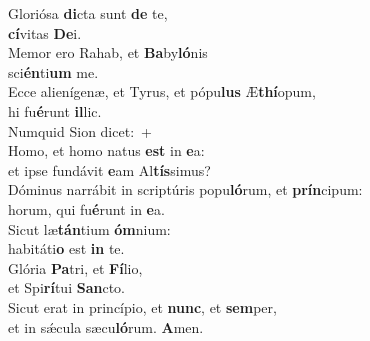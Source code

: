\evenverse Gloriósa \textbf{di}cta sunt \textbf{de} te,~\*\\
\evenverse \textbf{cí}vitas \textbf{De}i.\\
\oddverse Memor ero Rahab, et \textbf{Ba}by\textbf{ló}nis~\*\\
\oddverse sci\textbf{én}ti\textbf{um} me.\\
\evenverse Ecce alienígenæ, et Tyrus, et pópu\textbf{lus} Æ\textbf{thí}opum,~\*\\
\evenverse hi fu\textbf{é}runt \textbf{il}lic.\\
\oddverse Numquid Sion dicet:~+\\
\oddverse  Homo, et homo natus \textbf{est} in \textbf{e}a:~\*\\
\oddverse et ipse fundávit \textbf{e}am Al\textbf{tís}simus?\\
\evenverse Dóminus narrábit in scriptúris popu\textbf{ló}rum, et \textbf{prín}cipum:~\*\\
\evenverse horum, qui fu\textbf{é}runt in \textbf{e}a.\\
\oddverse Sicut læ\textbf{tán}tium \textbf{óm}nium:~\*\\
\oddverse habitáti\textbf{o} est \textbf{in} te.\\
\evenverse Glória \textbf{Pa}tri, et \textbf{Fí}lio,~\*\\
\evenverse et Spi\textbf{rí}tui \textbf{San}cto.\\
\oddverse Sicut erat in princípio, et \textbf{nunc}, et \textbf{sem}per,~\*\\
\oddverse et in sǽcula sæcu\textbf{ló}rum. \textbf{A}men.\\
